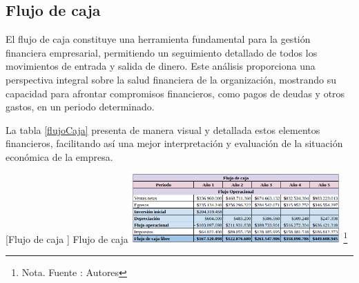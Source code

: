\subsection{Flujo de caja}

El flujo de caja constituye una herramienta fundamental para la gestión financiera empresarial, permitiendo un seguimiento detallado de todos los movimientos de entrada y salida de dinero. Este análisis proporciona una perspectiva integral sobre la salud financiera de la organización, mostrando su capacidad para afrontar compromisos financieros, como pagos de deudas y otros gastos, en un periodo determinado.

La tabla \ref{flujoCaja} presenta de manera visual y detallada estos elementos financieros, facilitando así una mejor interpretación y evaluación de la situación económica de la empresa.

\vspace{2mm}
\begin{minipage}{0.8\textwidth}
\centering
{}[{Flujo de caja }]{ Flujo de caja }
\label{flujoCaja}
\includegraphics[width=0.6\textwidth]{Content/Images/AF/FlujoDeCaja.png}
\footnote{Nota. \textup{Fuente : Autores}}
\end{minipage}
\newpage